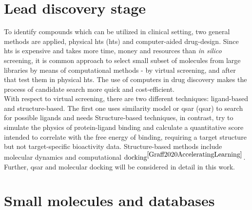 \section{Lead discovery stage}%

To identify compounds which can be utilized in clinical setting, two general methods are applied, physical \acrlong{hts} (\acrshort{hts}) and computer-aided drug-design.
Since \acrshort{hts} is expensive and takes more time, money and resources than \textit{in silico }screening, it is common approach to select small subset of molecules from large libraries by means of computational methods - by virtual screening, and after that test them in physical \acrshort{hts}.
The use of computers in drug discovery makes the process of candidate search more quick and cost-efficient.\\

With respect to virtual screening, there are two different techniques: ligand-based and structure-based. The first one uses similarity model
or \acrlong{qsar} (\acrshort{qsar}) to search for possible ligands and needs
Structure-based techniques, in contrast, try to simulate the physics of protein-ligand binding and calculate a quantitative score intended to correlate with the free energy of binding, requiring a target structure but not target-specific bioactivity data.
Structure-based methods include molecular dynamics and computational $\text{docking}^{\cite{Graff2020AcceleratingLearning}}$. Further, \acrshort{qsar} and molecular docking will be considered in detail in this work.\\

\section{Small molecules and databases}

